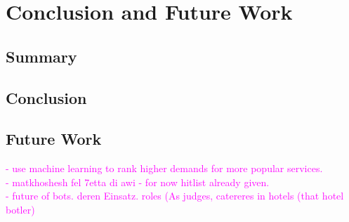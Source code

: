 \chapter{Conclusion and Future Work}
\label{conclusion}
\section{Summary}

\section{Conclusion}

\section{Future Work}
\textcolor{magenta}{
- use machine learning to rank higher demands for more popular services.\\ 
- matkhoshesh fel 7etta di awi - for now hitlist already given.\\
- future of bots. deren Einsatz. roles (As judges, catereres in hotels (that hotel botler) \\
}